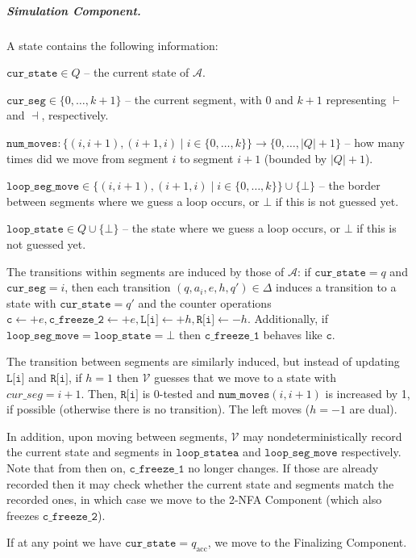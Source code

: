 \documentclass[USenglish]{lipics-v2021}
\newcommand{\lmark}{\vdash}
\newcommand{\rmark}{\dashv}
\newcommand{\accstate}{q_{\mathrm{acc}}}
\newcommand{\adds}[1]{\leftarrow #1}
\newcommand{\vf}[1]{\texttt{#1}}
\newcommand{\cA}{\mathcal{A}}
\newcommand{\cV}{\mathcal{V}}
\begin{document}
\subparagraph*{Simulation Component.} A state contains the following
information:
\begin{compactitem}
\item $\vf{cur\_state}\in Q$ -- the current state of $\cA$.
\item $\vf{cur\_seg}\in \{0,\ldots,k+1\}$ -- the current segment, with $0$ and $k+1$
representing $\lmark$ and $\rmark$, respectively.
\item $\vf{num\_moves}\colon\{(i,i+1),(i+1,i)\mid i\in \{0,\ldots,k\}\}\to \{0,\ldots,|Q|+1\}$ --
how many times did we move from segment $i$ to segment $i+1$ (bounded by
$|Q|+1$).
\item $\vf{loop\_seg\_move}\in \{(i,i+1),(i+1,i)\mid i\in \{0,\ldots,k\}\}\cup\{\bot\}$ -- the
border between segments where we guess a loop occurs, or $\bot$ if this is not
guessed yet.
\item $\vf{loop\_state}\in Q\cup\{\bot\}$ -- the state where we guess a loop occurs,
or $\bot$ if this is not guessed yet.
\end{compactitem} 
The transitions within segments are induced by those of $\cA$: if
$\vf{cur\_state}=q$ and $\vf{cur\_seg}=i$, then each transition
$(q,a_i,e,h,q')\in \Delta$ induces a transition to a state with $\vf{cur\_state}=q'$
and the counter operations
$\vf{c}\adds{+e}, \vf{c\_freeze\_2}\adds{+e}, \vf{L[i]}\adds{+h}, \vf{R[i]}\adds{-h}$.
Additionally, if $\vf{loop\_seg\_move}=\vf{loop\_state}=\bot$ then
$\vf{c\_freeze\_1}$ behaves like $\vf{c}$.

The transition between segments are similarly induced, but instead of updating
$\vf{L[i]}$ and $\vf{R[i]}$, if $h=1$ then $\cV$ guesses that we move to a state
with $cur\_seg=i+1$. Then, $\vf{R[i]}$ is 0-tested and $\vf{num\_moves}(i,i+1)$
is increased by 1, if possible (otherwise there is no transition).  The left
moves ($h=-1$ are dual).

In addition, upon moving between segments, $\cV$ may nondeterministically record
the current state and segments in $\vf{loop\_statea}$ and $\vf{loop\_seg\_move}$
respectively. Note that from then on, $\vf{c\_freeze\_1}$ no longer changes. If
those are already recorded then it may check whether the current state and
segments match the recorded ones, in which case we move to the 2-NFA Component
(which also freezes $\vf{c\_freeze\_2}$).

If at any point we have $\vf{cur\_state}=\accstate$, we move to the Finalizing
Component.
\end{document}
